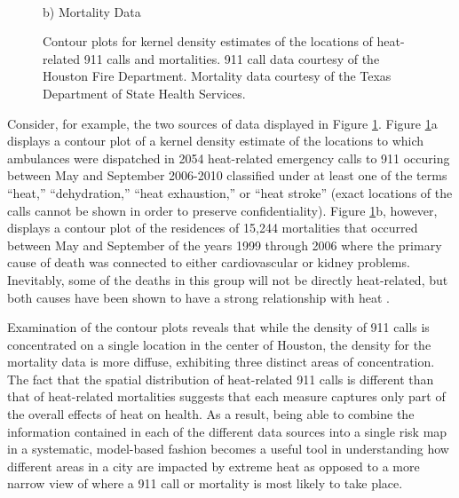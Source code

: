 \documentclass[final]{statsoc}
\begin{document}
\begin{figure}
\begin{minipage}[t]{0.49\textwidth}
    \\
    b) Mortality Data
    \\
  \end{minipage}
  \caption{Contour plots for kernel density estimates of the locations of heat-related 911 calls and mortalities. 911 call data courtesy of the Houston Fire Department. Mortality data courtesy of the Texas Department of State Health Services.}
  \label{kde}
\end{figure}

Consider, for example, the two sources of data displayed in 
Figure \ref{kde}. Figure \ref{kde}a displays a contour plot 
of a kernel density estimate of the locations to which ambulances were dispatched in 2054 heat-related emergency calls to 911 occuring between
May and September 2006-2010 classified under at least one of the
terms ``heat,'' ``dehydration,'' ``heat exhaustion,'' or ``heat
stroke'' (exact locations of the calls cannot be shown in order
to preserve confidentiality). Figure \ref{kde}b, however, displays
a contour plot of the residences of 15,244 mortalities
that occurred between May and September of the years 1999 through
2006 where the primary cause of death was connected to either
cardiovascular or kidney problems. Inevitably, some of the deaths in this group will not be directly heat-related, but both causes
have been shown to have a strong relationship with heat \citep{Kjellstrom2010}.

Examination of the contour plots reveals that while the 
density of 911 calls is concentrated on a single location in the 
center of Houston, the density for the mortality data is more
diffuse, exhibiting three distinct areas of concentration. 
The fact that the spatial distribution of heat-related 911 calls
is different than that of heat-related mortalities suggests that
each measure captures only part of the overall effects of heat on
health. As a result, being able to combine the information
contained in each of the different data sources into a single risk
map in a systematic, model-based fashion becomes a useful tool
in understanding how different areas in a city are impacted 
by extreme heat as opposed to a more narrow view of where a
911 call or mortality is most likely to take place.
\end{document}
